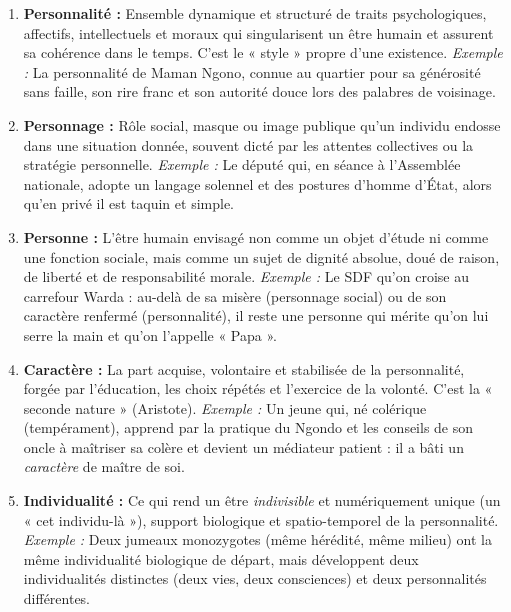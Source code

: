\documentclass[11pt]{article}
\begin{document}
\begin{corrige}
\begin{enumerate}
\item \textbf{Personnalité :} Ensemble dynamique et structuré de traits psychologiques, affectifs, intellectuels et moraux qui singularisent un être humain et assurent sa cohérence dans le temps. C'est le « style » propre d'une existence. \textit{Exemple :} La personnalité de Maman Ngono, connue au quartier pour sa générosité sans faille, son rire franc et son autorité douce lors des palabres de voisinage.
\item \textbf{Personnage :} Rôle social, masque ou image publique qu'un individu endosse dans une situation donnée, souvent dicté par les attentes collectives ou la stratégie personnelle. \textit{Exemple :} Le député qui, en séance à l'Assemblée nationale, adopte un langage solennel et des postures d'homme d'État, alors qu'en privé il est taquin et simple.
\item \textbf{Personne :} L'être humain envisagé non comme un objet d'étude ni comme une fonction sociale, mais comme un sujet de dignité absolue, doué de raison, de liberté et de responsabilité morale. \textit{Exemple :} Le SDF qu'on croise au carrefour Warda : au-delà de sa misère (personnage social) ou de son caractère renfermé (personnalité), il reste une personne qui mérite qu'on lui serre la main et qu'on l'appelle « Papa ».
\item \textbf{Caractère :} La part acquise, volontaire et stabilisée de la personnalité, forgée par l'éducation, les choix répétés et l'exercice de la volonté. C'est la « seconde nature » (Aristote). \textit{Exemple :} Un jeune qui, né colérique (tempérament), apprend par la pratique du Ngondo et les conseils de son oncle à maîtriser sa colère et devient un médiateur patient : il a bâti un \emph{caractère} de maître de soi.
\item \textbf{Individualité :} Ce qui rend un être \emph{indivisible} et numériquement unique (un « cet individu-là »), support biologique et spatio-temporel de la personnalité. \textit{Exemple :} Deux jumeaux monozygotes (même hérédité, même milieu) ont la même individualité biologique de départ, mais développent deux individualités distinctes (deux vies, deux consciences) et deux personnalités différentes.
\end{enumerate}
\end{corrige}
\end{document}
